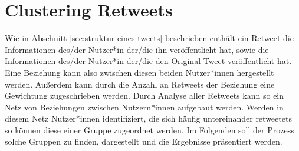 \chapter{Clustering Retweets}
\label{chap:cluster_retweets}
Wie in Abschnitt \ref{sec:struktur-eines-tweets} beschrieben enthält ein \gls{Retweet} die Informationen des/der Nutzer*in der/die ihn veröffentlicht hat, sowie die Informationen des/der Nutzer*in der/die den Original-Tweet veröffentlicht hat. Eine Beziehung kann also zwischen diesen beiden Nutzer*innen hergestellt werden. Außerdem kann durch die Anzahl an \glspl{Retweet} der Beziehung eine Gewichtung zugeschrieben werden. Durch Analyse aller \glspl{Retweet} kann so ein Netz von Beziehungen zwischen Nutzern*innen aufgebaut werden.
Werden in diesem Netz Nutzer*innen identifiziert, die sich häufig untereinander \glspl{retweetet} so können diese einer Gruppe zugeordnet werden. Im Folgenden soll der Prozess solche Gruppen zu finden, dargestellt und die Ergebnisse präsentiert werden.

